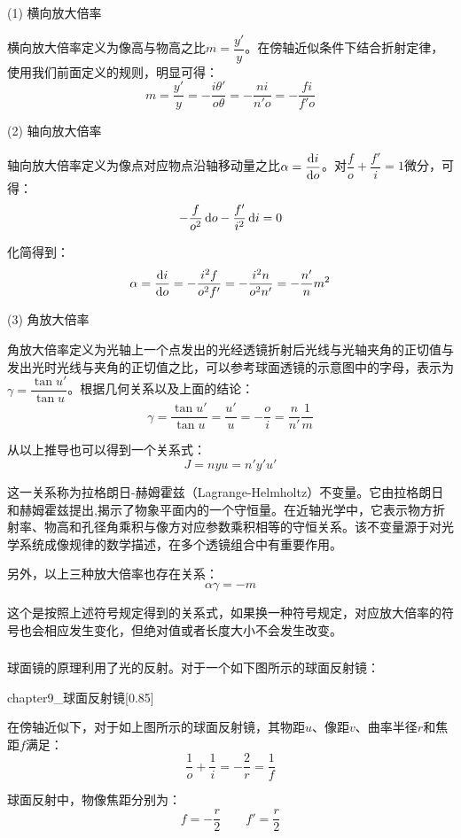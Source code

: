 (1) 横向放大倍率

横向放大倍率定义为像高与物高之比$m = \dfrac{y'}{y}$。在傍轴近似条件下结合折射定律，使用我们前面定义的规则，明显可得：
\[m = \dfrac{y'}{y} = -\dfrac{i\theta'}{o\theta} = -\dfrac{ni}{n'o} = -\dfrac{fi}{f'o}\]

(2) 轴向放大倍率

轴向放大倍率定义为像点对应物点沿轴移动量之比$\alpha = \dfrac{\dif i}{\dif o}$。对$\dfrac{f}{o} + \dfrac{f'}{i} = 1$微分，可得：
\[-\dfrac{f}{o^2} \dif o - \dfrac{f'}{i^2} \dif i = 0\]

化简得到：
\[\alpha = \dfrac{\dif i}{\dif o} = -\dfrac{i^2f}{o^2f'} = -\dfrac{i^2 n}{o ^2 n'} = -\dfrac{n'}{n}m^2\]

(3) 角放大倍率

角放大倍率定义为光轴上一个点发出的光经透镜折射后光线与光轴夹角的正切值与发出光时光线与夹角的正切值之比，可以参考球面透镜的示意图中的字母，表示为$\gamma = \dfrac{\tan u'}{\tan u}$。根据几何关系以及上面的结论：
\[\gamma = \dfrac{\tan u'}{\tan u} = \dfrac{u'}{u} = -\dfrac{o}{i} = \dfrac{n}{n'}\dfrac{1}{m}\]

从以上推导也可以得到一个关系式：
\[J = nyu = n'y'u'\]

这一关系称为拉格朗日-赫姆霍兹（Lagrange-Helmholtz）不变量。它由拉格朗日和赫姆霍兹提出,揭示了物象平面内的一个守恒量。在近轴光学中，它表示物方折射率、物高和孔径角乘积与像方对应参数乘积相等的守恒关系。该不变量源于对光学系统成像规律的数学描述，在多个透镜组合中有重要作用。

另外，以上三种放大倍率也存在关系：
\[\alpha\gamma = -m\]

这个是按照上述符号规定得到的关系式，如果换一种符号规定，对应放大倍率的符号也会相应发生变化，但绝对值或者长度大小不会发生改变。
\subsubsection[球面反射镜]{}
球面镜的原理利用了光的反射。对于一个如下图所示的球面反射镜：
\begin{singlefigure}[球面反射镜]{chapter9_球面反射镜}[0.85]
\end{singlefigure}

\begin{law}
    在傍轴近似下，对于如上图所示的球面反射镜，其物距$u$、像距$v$、曲率半径$r$和焦距$f$满足：
    \[\dfrac{1}{o} + \dfrac{1}{i} = -\dfrac{2}{r} = \dfrac{1}{f}\]

    球面反射中，物像焦距分别为：
    \[f = -\dfrac{r}{2} \qquad f' = \dfrac{r}{2}\]
    
\end{law}


